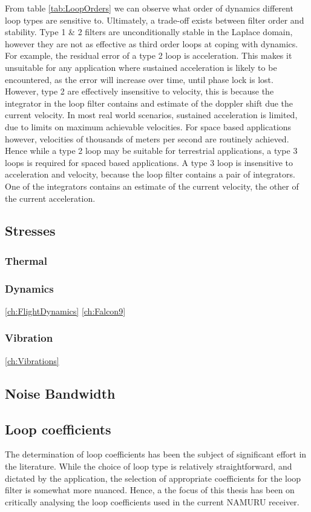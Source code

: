     From table \ref{tab:LoopOrders} we can observe what order of dynamics different loop types are sensitive to. Ultimately, a trade-off exists between filter order and stability. Type 1 \& 2 filters are unconditionally stable in the Laplace domain, however they are not as effective as third order loops at coping with dynamics. For example, the residual error of a type 2 loop is acceleration. This makes it unsuitable for any application where sustained acceleration is likely to be encountered, as the error will increase over time, until phase lock is lost. However, type 2 are effectively insensitive to velocity, this is because the integrator in the loop filter contains and estimate of the doppler shift due the current velocity. In most real world scenarios, sustained acceleration is limited, due to limits on maximum achievable velocities. For space based applications however, velocities of thousands of meters per second are routinely achieved. Hence while a type 2 loop may be suitable for terrestrial applications, a type 3 loops is required for spaced based applications. A type 3 loop is insensitive to acceleration and velocity, because the loop filter contains a pair of integrators. One of the integrators contains an estimate of the current velocity, the other of the current acceleration\cite{Kaplan}. 
    
    
    
	\subsection{Stresses}
		\subsubsection{Thermal}
		\subsubsection{Dynamics}
		\ref{ch:FlightDynamics}
		\ref{ch:Falcon9}
		\subsubsection{Vibration}
		\ref{ch:Vibrations}

    \subsection{Noise Bandwidth}
    
    
	\subsection{Loop coefficients}
	The determination of loop coefficients has been the subject of significant effort in the literature.  While the choice of loop type is relatively straightforward, and dictated by the application, the selection of appropriate coefficients for the loop filter is somewhat more nuanced. Hence, a the focus of this thesis has been on critically analysing the loop coefficients used in the current \ac{NAMURU} receiver. 
	
